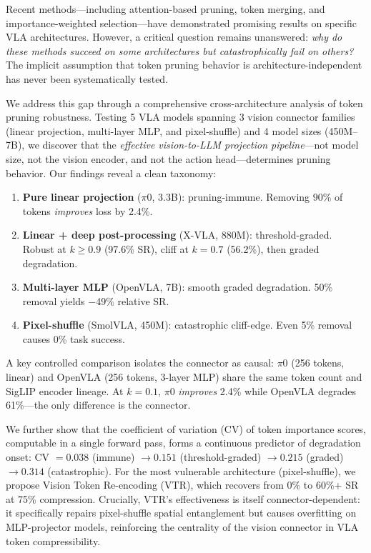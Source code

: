 \documentclass[letterpaper]{article}
\begin{document}
Recent methods---including attention-based pruning, token merging, and importance-weighted selection---have demonstrated promising results on specific VLA architectures. However, a critical question remains unanswered: \emph{why do these methods succeed on some architectures but catastrophically fail on others?} The implicit assumption that token pruning behavior is architecture-independent has never been systematically tested.

We address this gap through a comprehensive cross-architecture analysis of token pruning robustness. Testing 5 VLA models spanning 3 vision connector families (linear projection, multi-layer MLP, and pixel-shuffle) and 4 model sizes (450M--7B), we discover that the \emph{effective vision-to-LLM projection pipeline}---not model size, not the vision encoder, and not the action head---determines pruning behavior. Our findings reveal a clean taxonomy:

\begin{enumerate}[leftmargin=*,nosep]
    \item \textbf{Pure linear projection} ($\pi$0, 3.3B): pruning-immune. Removing 90\% of tokens \emph{improves} loss by 2.4\%.
    \item \textbf{Linear + deep post-processing} (X-VLA, 880M): threshold-graded. Robust at $k{\geq}0.9$ (97.6\% SR), cliff at $k{=}0.7$ (56.2\%), then graded degradation.
    \item \textbf{Multi-layer MLP} (OpenVLA, 7B): smooth graded degradation. 50\% removal yields $-$49\% relative SR.
    \item \textbf{Pixel-shuffle} (SmolVLA, 450M): catastrophic cliff-edge. Even 5\% removal causes 0\% task success.
\end{enumerate}

A key controlled comparison isolates the connector as causal: $\pi$0 (256 tokens, linear) and OpenVLA (256 tokens, 3-layer MLP) share the same token count and SigLIP encoder lineage. At $k{=}0.1$, $\pi$0 \emph{improves} 2.4\% while OpenVLA degrades 61\%---the only difference is the connector.

We further show that the coefficient of variation (CV) of token importance scores, computable in a single forward pass, forms a continuous predictor of degradation onset: CV $= 0.038$ (immune) $\to 0.151$ (threshold-graded) $\to 0.215$ (graded) $\to 0.314$ (catastrophic). For the most vulnerable architecture (pixel-shuffle), we propose Vision Token Re-encoding (VTR), which recovers from 0\% to 60\%+ SR at 75\% compression. Crucially, VTR's effectiveness is itself connector-dependent: it specifically repairs pixel-shuffle spatial entanglement but causes overfitting on MLP-projector models, reinforcing the centrality of the vision connector in VLA token compressibility.
\end{document}
